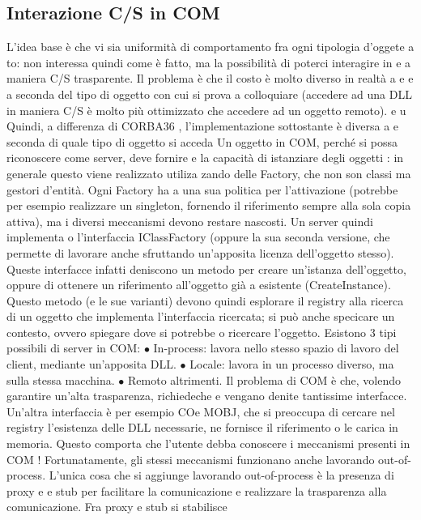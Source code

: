\documentclass[a4paper,12pt]{article}
\begin{document}
\subsection{Interazione C/S in COM}
L'idea base è che vi sia uniformità di comportamento fra ogni tipologia d'oggete
a
to: non interessa quindi come è fatto, ma la possibilità di poterci interagire in
e
a
maniera C/S trasparente. Il problema è che il costo è molto diverso in realtà a
e
e
a
seconda del tipo di oggetto con cui si prova a colloquiare (accedere ad una DLL
in maniera C/S è molto più ottimizzato che accedere ad un oggetto remoto).
e
u
Quindi, a differenza di CORBA36 , l'implementazione sottostante è diversa a
e
seconda di quale tipo di oggetto si acceda
Un oggetto in COM, perché si possa riconoscere come server, deve fornire
e
la capacità di istanziare degli oggetti : in generale questo viene realizzato utiliza
zando delle Factory, che non son classi ma gestori d'entità. Ogni Factory ha
a
una sua politica per l'attivazione (potrebbe per esempio realizzare un singleton,
fornendo il riferimento sempre alla sola copia attiva), ma i diversi meccanismi
devono restare nascosti.
Un server quindi implementa o l'interfaccia IClassFactory (oppure la sua
seconda versione, che permette di lavorare anche sfruttando un'apposita licenza dell'oggetto stesso). Queste interfacce
infatti deniscono un metodo per
creare un'istanza dell'oggetto, oppure di ottenere un riferimento all'oggetto già
a
esistente (CreateInstance). Questo metodo (e le sue varianti) devono quindi
esplorare il registry alla ricerca di un oggetto che implementa l'interfaccia ricercata; si può anche specicare un
contesto, ovvero spiegare dove si potrebbe
o
ricercare l'oggetto.
Esistono 3 tipi possibili di server in COM:
$\bullet$ In-process: lavora nello stesso spazio di lavoro del client, mediante un'apposita DLL.
$\bullet$ Locale: lavora in un processo diverso, ma sulla stessa macchina.
$\bullet$ Remoto altrimenti.
Il problema di COM è che, volendo garantire un'alta trasparenza, richiedeche
e
vengano denite tantissime interfacce. Un'altra interfaccia è per esempio COe
MOBJ, che si preoccupa di cercare nel registry l'esistenza delle DLL necessarie,
ne fornisce il riferimento o le carica in memoria. Questo comporta che l'utente debba conoscere i meccanismi presenti in
COM ! Fortunatamente, gli stessi
meccanismi funzionano anche lavorando out-of-process.
L'unica cosa che si aggiunge lavorando out-of-process è la presenza di proxy
e
e stub per facilitare la comunicazione e realizzare la trasparenza alla comunicazione. Fra proxy e stub si stabilisce
\end{document}
